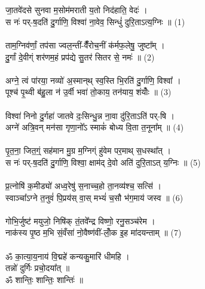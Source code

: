 \section{}
जा॒तवे॑दसे सुनवा म॒सोम॑मराती य॒तो निद॑हाति॒ वेदः॑ ।\\
स नः॑ पर्-ष॒दति॑ दु॒र्गाणि॒ विश्वा॑ ना॒वेव॒ सिन्धुं॑ दुरि॒ताऽत्य॒ग्निः ॥ (1)\\
\\
ताम॒ग्निव॑र्णां॒ तप॑सा ज्वल॒न्तीं-वैँ॑रोच॒नीं क॑र्मफ॒लेषु॒ जुष्टा᳚म् ।\\
दु॒र्गां दे॒वीग्ं शर॑णम॒हं प्रप॑द्ये सु॒तर॑ सितर से॒ नमः॑ ॥ (2)\\
\\
अग्ने॒ त्वं पा॑रया॒ नव्यो॑ अ॒स्मान्​थ् स्व॒स्ति भि॒रति॑ दु॒र्गाणि॒ विश्वा᳚ ।\\
पूश्च॑ पृ॒थ्वी ब॑हु॒ला न॑ उ॒र्वी भवा॑ तो॒काय॒ तन॑याय॒ शं​योँः ॥ (3)\\
\\
विश्वा॑ निनो दु॒र्गहा॑ जातवे दः॒सिन्धु॒न्न ना॒वा दु॑रि॒ताऽति॑ पर्-षि ।\\
अग्ने॑ अत्रि॒वन् मन॑सा गृणा॒नो᳚ऽ स्माकं॑ बोध्य वि॒ता त॒नूना᳚म् ॥ (4)\\
\\
पृ॒त॒ना॒ जित॒ग्ं॒ सह॑मान मु॒ग्र म॒ग्निग्ं हु॑वेम पर॒माथ् स॒धस्था᳚त् ।\\
स नः॑ पर्-ष॒दति॑ दु॒र्गाणि॒ विश्वा॒ क्षाम॑द् दे॒वो अति॑ दुरि॒ताऽत् य॒ग्निः ॥ (5)\\
\\
प्र॒त्नोषि॑ क॒मीड्यो॑ अध्व॒रेषु॑ स॒नाच्च॒हो ता॒नव्य॑श्च॒ सत्सि॑ ।\\
स्वाञ्चा᳚ऽग्ने त॒नुवं॑ पि॒प्रय॑स् वा॒स् मभ्यं॑ च॒सौ भ॑ग॒माय॑ जस्व ॥ (6)\\
\\
गोभि॒र्जुष्ट॑ मयुजो॒ निषि॑क् तं॒तवे᳚न्द्र विष्णो॒ रनु॒सञ्च॑रेम ।\\
नाक॑स्य पृ॒ष्ठ म॒भि सं॒वँसा॑ नो॒वैष्ण॑वीं-लोँ॒क इ॒ह मा॑दयन्ताम् ॥ (7)\\
\\
ॐ का॒त्या॒य॒नाय॑ वि॒द्महे॑ कन्यकु॒मारि॑ धीमहि । \\
तन्नो॑ दुर्गिः प्रचो॒दया᳚त् ॥\\
ॐ शान्तिः॒ शान्तिः॒ शान्तिः॑ ॥\\
